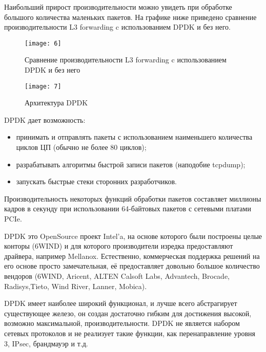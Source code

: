 Наибольший прирост производительности можно увидеть при обработке большого количества маленьких пакетов. На графике ниже приведено сравнение производительности L3 forwarding c использованием DPDK и без него.\par 

\begin{figure}[h!]
    \centering
    \texttt{[image: 6]}
    \caption{Сравнение производительности L3 forwarding c использованием DPDK и без него}
    \label{img:6}
\end{figure} 

\begin{figure}[h!]
    \centering
    \texttt{[image: 7]}
    \caption{Архитектура DPDK}
    \label{img:7}
\end{figure} 

\clearpage

DPDK дает возможность:
\begin{itemize}
\item принимать и отправлять пакеты с использованием наименьшего количества циклов ЦП (обычно не более 80 циклов);
\item разрабатывать алгоритмы быстрой записи пакетов (наподобие tcpdump);
\item запускать быстрые стеки сторонних разработчиков.
\end{itemize}

Производительность некоторых функций обработки пакетов составляет миллионы кадров в секунду при использовании 64-байтовых пакетов с сетевыми платами PCIe\*.\par

DPDK это OpenSource проект Intel'a, на основе которого были построены целые конторы (6WIND) и для которого производители изредка предоставляют драйвера, например Mellanox. Естественно, коммерческая поддержка решений на его основе просто замечательная, её предоставляет довольно большое количество вендоров (6WIND, Aricent, ALTEN Calsoft Labs, Advantech, Brocade, Radisys,Tieto, Wind River, Lanner, Mobica).\par 
 
DPDK имеет наиболее широкий функционал, и лучше всего абстрагирует существующее железо, он создан достаточно гибким для достижения высокой, возможно максимальной, производительности.
DPDK не является набором сетевых протоколов и не реализует такие функции, как перенаправление уровня 3, IPsec, брандмауэр и т.д. \par 
